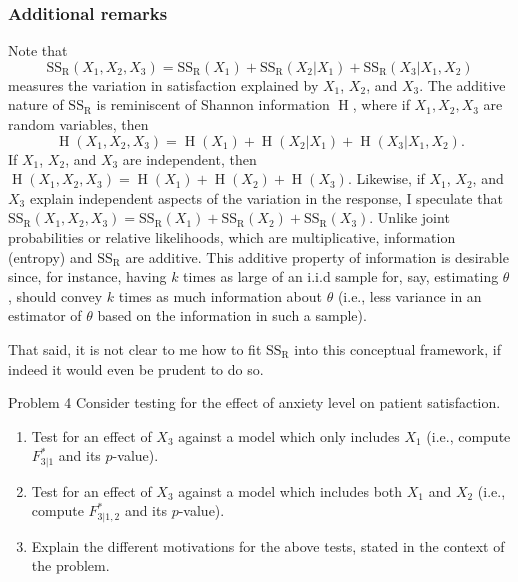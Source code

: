 \documentclass[
]{article}
\begin{document}
\hypertarget{additional-remarks}{%
\subsubsection{Additional remarks}\label{additional-remarks}}

Note that \[
  \mathrm{SS_{R}}(X_1,X_2,X_3) = \mathrm{SS_{R}}(X_1) + \mathrm{SS_{R}}(X_2|X_1) + \mathrm{SS_{R}}(X_3|X_1,X_2)
\] measures the variation in satisfaction explained by \(X_1\), \(X_2\),
and \(X_3\). The additive nature of \(\mathrm{SS_{R}}\) is reminiscent
of Shannon information \(\operatorname{H}\), where if \(X_1,X_2,X_3\)
are random variables, then \[
  \operatorname{H}(X_1,X_2,X_3) = \operatorname{H}(X_1) + \operatorname{H}(X_2|X_1) + \operatorname{H}(X_3|X_1,X_2).
\] If \(X_1\), \(X_2\), and \(X_3\) are independent, then
\(\operatorname{H}(X_1,X_2,X_3) = \operatorname{H}(X_1) + \operatorname{H}(X_2) + \operatorname{H}(X_3)\).
Likewise, if \(X_1\), \(X_2\), and \(X_3\) explain independent aspects
of the variation in the response, I speculate that
\(\mathrm{SS_{R}}(X_1,X_2,X_3) = \mathrm{SS_{R}}(X_1) + \mathrm{SS_{R}}(X_2) + \mathrm{SS_{R}}(X_3)\).
Unlike joint probabilities or relative likelihoods, which are
multiplicative, information (entropy) and \(\mathrm{SS_{R}}\) are
additive. This additive property of information is desirable since, for
instance, having \(k\) times as large of an i.i.d sample for, say,
estimating \(\theta\), should convey \(k\) times as much information
about \(\theta\) (i.e., less variance in an estimator of \(\theta\)
based on the information in such a sample).

That said, it is not clear to me how to fit \(\mathrm{SS_{R}}\) into
this conceptual framework, if indeed it would even be prudent to do so.

\begin{tcolorbox}[split=\f]
Problem 4
\tcblower
Consider testing for the effect of anxiety level on patient satisfaction.

\begin{enumerate}
  \item[(a)] Test for an effect of $X_3$ against a model which only includes
  $X_1$ (i.e., compute $F_{3|1}^*$ and its $p$-value).
  \item[(b)] Test for an effect of $X_3$ against a model which includes both
  $X_1$ and $X_2$ (i.e., compute $F_{3|1,2}^*$ and its $p$-value).
  \item[(c)] Explain the different motivations for the above tests, stated in
  the context of the problem.
\end{enumerate}
\end{tcolorbox}
\end{document}
